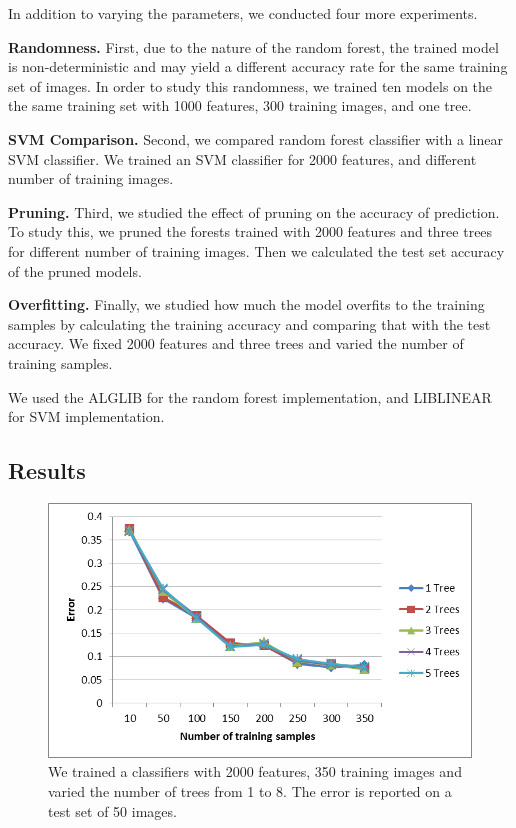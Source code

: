 In addition to varying the parameters, we conducted four more experiments. 

\textbf{Randomness.} First, due to the nature of the random forest, the trained model is non-deterministic and may yield a different accuracy rate for the same training set of images. In order to study this randomness, we trained ten models on the the same training set with 1000 features, 300 training images, and one tree. 

\textbf{SVM Comparison.} Second, we compared random forest classifier with a linear SVM classifier. We trained an SVM classifier for 2000 features, and different number of training images. 

\textbf{Pruning.} Third, we studied the effect of pruning on the accuracy of prediction. To study this, we pruned the forests trained with 2000 features and three trees for different number of training images. Then we calculated the test set accuracy of the pruned models.

\textbf{Overfitting.} Finally, we studied how much the model overfits to the training samples by calculating the training accuracy and comparing that with the test accuracy. We fixed 2000 features and three trees and varied the number of training samples. 

We used the ALGLIB \cite{alglib} for the random forest implementation, and LIBLINEAR \cite{liblinear} for SVM implementation.

\subsection{Results}

\begin{figure}
\begin{center}
\includegraphics[width=0.45 \textwidth]{fig/varytrees.png}
\end{center}
\caption{We trained a classifiers with 2000 features, 350 training images and varied the number of trees from 1 to 8. The error is reported on a test set of 50 images.}
\label{fig:varytrees}
\end{figure}

